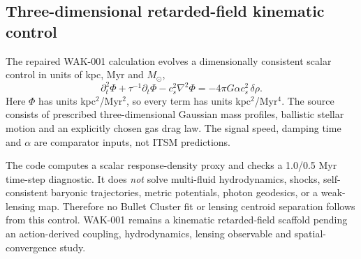 \subsection{Three-dimensional retarded-field kinematic control}

The repaired WAK-001 calculation evolves a dimensionally consistent scalar
control in units of kpc, Myr and $M_\odot$,
\begin{equation}
 \partial_t^2\Phi+\tau^{-1}\partial_t\Phi-c_s^2\nabla^2\Phi
 =-4\pi G\alpha c_s^2\,\delta\rho .
 \label{eq:causal-wave-3d}
\end{equation}
Here $\Phi$ has units kpc$^2$/Myr$^2$, so every term has units
kpc$^2$/Myr$^4$.  The source consists of prescribed three-dimensional
Gaussian mass profiles, ballistic stellar motion and an explicitly chosen gas
drag law.  The signal speed, damping time and $\alpha$ are comparator inputs,
not ITSM predictions.

The code computes a scalar response-density proxy and checks a 1.0/0.5 Myr
time-step diagnostic.  It does \emph{not} solve multi-fluid hydrodynamics,
shocks, self-consistent baryonic trajectories, metric potentials, photon
geodesics, or a weak-lensing map.  Therefore no Bullet Cluster fit or lensing
centroid separation follows from this control.  WAK-001 remains a kinematic
retarded-field scaffold pending an action-derived coupling, hydrodynamics,
lensing observable and spatial-convergence study.
